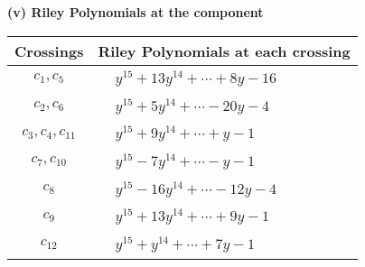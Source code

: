 \documentclass[1p]{elsarticle_modified}
\theoremstyle{definition}
\begin{document}
\newpage\renewcommand{\arraystretch}{1}
\flushleft \textbf{(v) Riley Polynomials at the component}\newline \\
\begin{tabular}{m{50pt}|m{274pt}}
Crossings & \hspace{64pt}Riley Polynomials at each crossing \\
\hline $$\begin{aligned}c_{1},c_{5}\end{aligned}$$&$\begin{aligned}
&y^{15}+13 y^{14}+\cdots+8 y-16
\end{aligned}$\\
\hline $$\begin{aligned}c_{2},c_{6}\end{aligned}$$&$\begin{aligned}
&y^{15}+5 y^{14}+\cdots-20 y-4
\end{aligned}$\\
\hline $$\begin{aligned}c_{3},c_{4},c_{11}\end{aligned}$$&$\begin{aligned}
&y^{15}+9 y^{14}+\cdots+y-1
\end{aligned}$\\
\hline $$\begin{aligned}c_{7},c_{10}\end{aligned}$$&$\begin{aligned}
&y^{15}-7 y^{14}+\cdots- y-1
\end{aligned}$\\
\hline $$\begin{aligned}c_{8}\end{aligned}$$&$\begin{aligned}
&y^{15}-16 y^{14}+\cdots-12 y-4
\end{aligned}$\\
\hline $$\begin{aligned}c_{9}\end{aligned}$$&$\begin{aligned}
&y^{15}+13 y^{14}+\cdots+9 y-1
\end{aligned}$\\
\hline $$\begin{aligned}c_{12}\end{aligned}$$&$\begin{aligned}
&y^{15}+y^{14}+\cdots+7 y-1
\end{aligned}$\\
\hline
\end{tabular}\\~\\
\end{document}
